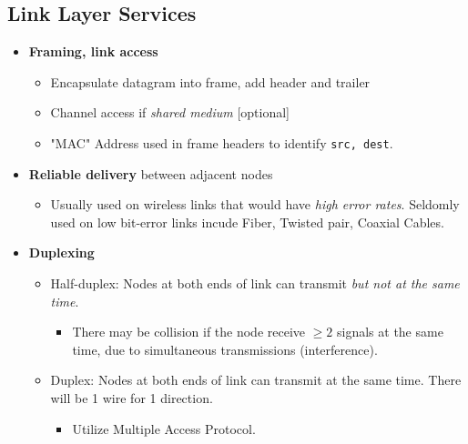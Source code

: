 \documentclass[a4paper]{article}
\begin{document}
\subsection{Link Layer Services}
\begin{itemize}
    \item \textbf{Framing, link access}
    \begin{itemize}[label=$\circ$]
        \item Encapsulate datagram into frame, add header and trailer
        \item Channel access if \textit{shared medium} [optional]
        \item "MAC" Address used in frame headers to identify \texttt{src, dest}.
    \end{itemize}
    \item \textbf{Reliable delivery} between adjacent nodes
    \begin{itemize}[label=$\circ$]
        \item Usually used on wireless links that would have \textit{high error rates}. Seldomly used on low bit-error links incude Fiber, Twisted pair, Coaxial Cables.
    \end{itemize}
    \item \textbf{Duplexing}
    \begin{itemize}[label=$\circ$]
        \item Half-duplex: Nodes at both ends of link can transmit \textit{but not at the same time}.
        \begin{itemize}[label=\tiny$\blacksquare$]
            \item There may be collision if the node receive $\geq 2$ signals at the same time, due to simultaneous transmissions (interference).
        \end{itemize}
        \item Duplex: Nodes at both ends of link can transmit at the same time. There will be 1 wire for 1 direction.
        \begin{itemize}[label=\tiny$\blacksquare$]
            \item Utilize Multiple Access Protocol.
        \end{itemize}
    \end{itemize}
\end{itemize}

\newpage
\end{document}
